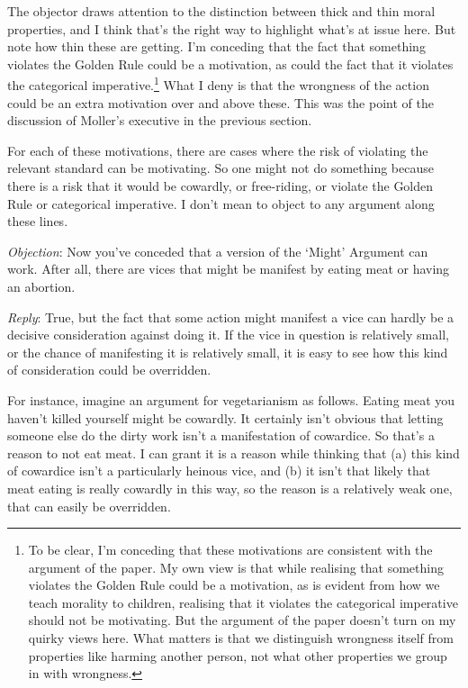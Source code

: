 \documentclass[
  11pt,
  letterpaper,
  DIV=11,
  numbers=noendperiod,
  twoside]{scrartcl}
\begin{document}
The objector draws attention to the distinction between thick and thin
moral properties, and I think that's the right way to highlight what's
at issue here. But note how thin these are getting. I'm conceding that
the fact that something violates the Golden Rule could be a motivation,
as could the fact that it violates the categorical
imperative.\footnote{To be clear, I'm conceding that these motivations
  are consistent with the argument of the paper. My own view is that
  while realising that something violates the Golden Rule could be a
  motivation, as is evident from how we teach morality to children,
  realising that it violates the categorical imperative should not be
  motivating. But the argument of the paper doesn't turn on my quirky
  views here. What matters is that we distinguish wrongness itself from
  properties like harming another person, not what other properties we
  group in with wrongness.} What I deny is that the wrongness of the
action could be an extra motivation over and above these. This was the
point of the discussion of Moller's executive in the previous section.

For each of these motivations, there are cases where the risk of
violating the relevant standard can be motivating. So one might not do
something because there is a risk that it would be cowardly, or
free-riding, or violate the Golden Rule or categorical imperative. I
don't mean to object to any argument along these lines.

\emph{Objection}: Now you've conceded that a version of the `Might'
Argument can work. After all, there are vices that might be manifest by
eating meat or having an abortion.

\emph{Reply}: True, but the fact that some action might manifest a vice
can hardly be a decisive consideration against doing it. If the vice in
question is relatively small, or the chance of manifesting it is
relatively small, it is easy to see how this kind of consideration could
be overridden.

For instance, imagine an argument for vegetarianism as follows. Eating
meat you haven't killed yourself might be cowardly. It certainly isn't
obvious that letting someone else do the dirty work isn't a
manifestation of cowardice. So that's a reason to not eat meat. I can
grant it is a reason while thinking that (a) this kind of cowardice
isn't a particularly heinous vice, and (b) it isn't that likely that
meat eating is really cowardly in this way, so the reason is a
relatively weak one, that can easily be overridden.
\end{document}
